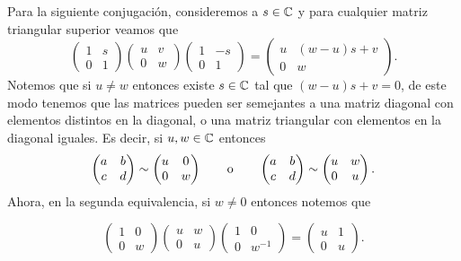 Para la siguiente conjugación, consideremos a $s \in \mathbb{C}$ y para cualquier matriz triangular superior veamos que
\begin{equation}
  \begin{pmatrix} 1 & s \\ 0 & 1 \end{pmatrix}
  \begin{pmatrix} u & v \\ 0 & w \end{pmatrix}
  \begin{pmatrix} 1 & -s \\ 0 & 1 \end{pmatrix}
    = \begin{pmatrix} u & (w-u)s + v \\ 0 & w \end{pmatrix}.
\end{equation}
Notemos que si $u \neq w$  entonces existe $s \in \mathbb{C}$ tal que $(w-u)s + v = 0$, de este modo tenemos que las matrices pueden ser semejantes a una matriz diagonal con elementos distintos en la diagonal, o una matriz triangular con elementos en la diagonal iguales. Es decir, si $u,w \in \mathbb{C}$ entonces
\[
  \begin{pmatrix} a & b \\ c & d \end{pmatrix} \sim \begin{pmatrix} u & 0 \\ 0 & w \end{pmatrix}
    \qquad\text{o}\qquad
    \begin{pmatrix} a & b \\ c & d \end{pmatrix} \sim \begin{pmatrix} u & w \\ 0 & u \end{pmatrix}.
\]
Ahora, en la segunda equivalencia, si $w \neq 0$ entonces notemos que

\begin{equation}
  \begin{pmatrix} 1 & 0 \\ 0 & w \end{pmatrix}
  \begin{pmatrix} u & w \\ 0 & u \end{pmatrix}
  \begin{pmatrix} 1 & 0 \\ 0 & w^{-1} \end{pmatrix}
    = \begin{pmatrix} u & 1 \\ 0 & u \end{pmatrix}.
\end{equation}

